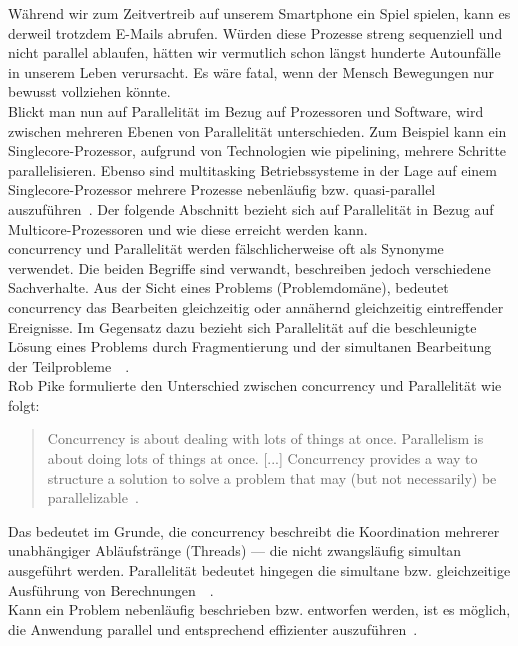 Während wir zum Zeitvertreib auf unserem Smartphone ein Spiel spielen, kann es derweil trotzdem E-Mails abrufen. Würden diese Prozesse streng sequenziell und nicht parallel ablaufen, hätten wir vermutlich schon längst hunderte Autounfälle in unserem Leben verursacht. Es wäre fatal, wenn der Mensch Bewegungen nur bewusst vollziehen könnte.\\
Blickt man nun auf Parallelität im Bezug auf Prozessoren und Software, wird zwischen mehreren Ebenen von Parallelität unterschieden. Zum Beispiel kann ein Singlecore-Prozessor, aufgrund von Technologien wie \gls{pipelining}, mehrere Schritte parallelisieren. Ebenso sind \gls{multitasking} Betriebssysteme in der Lage auf einem Singlecore-Prozessor mehrere Prozesse nebenläufig bzw. quasi-parallel auszuführen~\cite[S.~3~\&~S.~4]{butcher_seven_2014}. Der folgende Abschnitt bezieht sich auf Parallelität in Bezug auf Multicore-Prozessoren und wie diese erreicht werden kann.\\
\gls{concurrency} und Parallelität werden fälschlicherweise oft als Synonyme verwendet. Die beiden Begriffe sind verwandt, beschreiben jedoch verschiedene Sachverhalte. Aus der Sicht eines Problems (Problemdomäne), bedeutet \gls{concurrency} das Bearbeiten gleichzeitig oder annähernd gleichzeitig eintreffender Ereignisse. Im Gegensatz dazu bezieht sich Parallelität auf die beschleunigte Lösung eines Problems durch Fragmentierung und der simultanen Bearbeitung der Teilprobleme~\cite[S.~1~\&~S.~2]{butcher_seven_2014}~\cite[S.~15]{vernon_reactive_2016}.\\
Rob Pike formulierte den Unterschied zwischen \gls{concurrency} und Parallelität wie folgt:

\begin{quotation}
  Concurrency is about dealing with lots of things at once. Parallelism is about doing lots of things at once. [...] Concurrency provides a way to structure a solution to solve a problem that may (but not necessarily) be parallelizable~.
\cite[S.~10]{pike_concurrency_2012}
\end{quotation}

Das bedeutet im Grunde, die \gls{concurrency} beschreibt die Koordination mehrerer unabhängiger Abläufstränge (Threads) --- die nicht zwangsläufig simultan ausgeführt werden. Parallelität bedeutet hingegen die simultane bzw. gleichzeitige Ausführung von Berechnungen~\cite[S.~8-9]{pike_concurrency_2012}~\cite[S.~3]{butcher_seven_2014}.\\

Kann ein Problem nebenläufig beschrieben bzw. entworfen werden, ist es möglich, die Anwendung parallel und entsprechend effizienter auszuführen~\cite[S.~19~\&~S.~30]{pike_concurrency_2012}.\\

